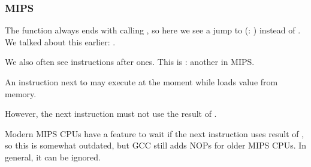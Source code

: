 \subsubsection{MIPS}




The function always ends with calling \puts, so here we see a jump to \puts (: ) instead of .
We talked about this earlier: .

We also often see  instructions after  ones.
This is : another  in MIPS.

An instruction next to  may execute at the moment while  loads value from memory. 

However, the next instruction must not use the result of .

Modern MIPS CPUs have a feature to wait if the next instruction uses result of , so this is somewhat outdated,
but GCC still adds NOPs for older MIPS CPUs.
In general, it can be ignored.
